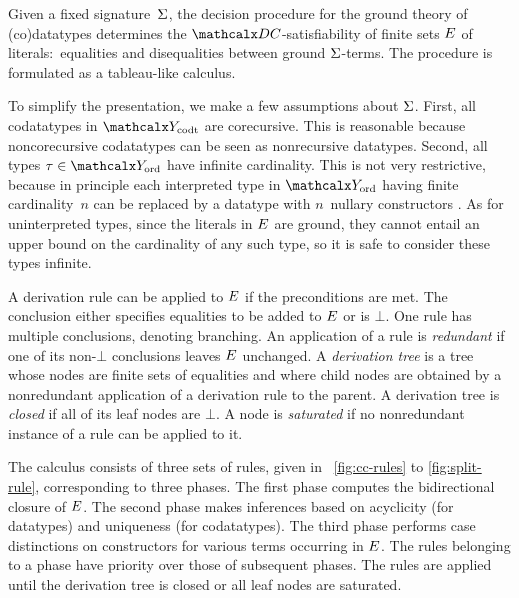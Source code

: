 Given a fixed signature~$\mathrm{\Sigma}$,
the decision procedure for the ground theory of (co)datatypes %
determines the
$\thD$-satisfiability of finite sets $E$ of literals:\ equalities
and disequalities between ground $\mathrm{\Sigma}$-terms. The
procedure is formulated as a tableau-like calculus.

To simplify the presentation, we make a few assumptions about
$\mathrm{\Sigma}$.
First, all codatatypes in $\Codata$ are corecursive. This is reasonable
because noncorecursive codatatypes can be seen as nonrecursive
datatypes.
Second, all types $\tau \in \Nondata$ have infinite cardinality.
This is not very restrictive, because in principle each interpreted type in
$\Nondata$ having finite cardinality~$n$
can be replaced by a %
datatype with $n$~nullary constructors
\cite{barrett-et-al-2007}.
As for uninterpreted types, since the literals in $E$
are ground, they cannot entail an upper
bound on the cardinality of any such type, so it is safe to consider these types infinite.


A derivation rule can be applied to $E$ if %
the %
preconditions are met.
The conclusion either specifies equalities to be added to $E$
or is $\bot$. %
One rule has multiple conclusions, %
denoting branching.
%
An application of a rule is \emph{redundant} if one of its non-$\bot$
conclusions leaves $E$ unchanged.
A \emph{derivation tree} is a %
tree whose nodes are finite sets of
equalities and where child nodes are obtained by a nonredundant application of a
derivation rule to the parent. A derivation tree is \emph{closed} if all of
its leaf nodes are $\bot$. A node is \emph{saturated} if no nonredundant
instance of a rule can be applied to it.

The calculus consists of three sets of rules, given in
\figuresname~\ref{fig:cc-rules} to \ref{fig:split-rule}, corresponding to three
phases. The first phase computes the bidirectional closure of $E$. The second
phase makes inferences based on acyclicity (for datatypes) and uniqueness
(for codatatypes).
The third phase performs case distinctions on constructors for
various terms occurring in $E$.
%
The rules belonging to a phase have priority over those of %
subsequent
phases. The rules are applied until the derivation tree is closed or all leaf nodes
are saturated.

